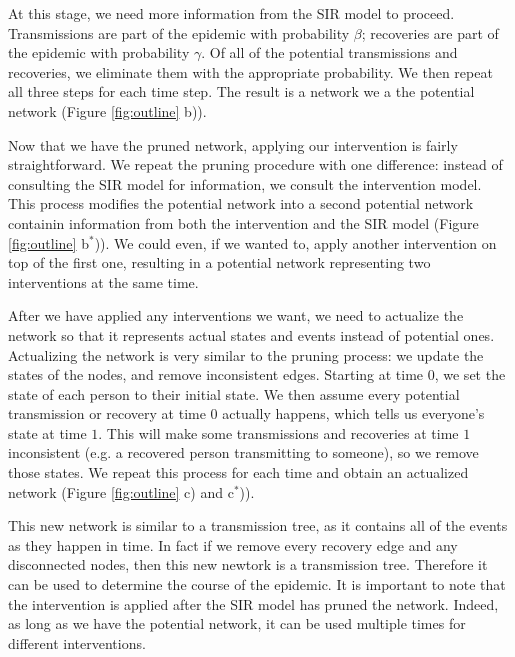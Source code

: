 \documentclass[PTRSB]{rsos}
\begin{document}
\begin{multicols}{2}
At this stage, we need more information from the SIR model to proceed.
Transmissions are part of the epidemic with probability $\beta$; recoveries are part of the epidemic with probability $\gamma$.
Of all of the potential transmissions and recoveries, we eliminate them with the appropriate probability.
We then repeat all three steps for each time step.
The result is a network we a the potential network (Figure \ref{fig:outline} b)).

Now that we have the pruned network, applying our intervention is fairly straightforward.
We repeat the pruning procedure with one difference: instead of consulting the SIR model for information, we consult the intervention model.
This process modifies the potential network into a second potential network containin information from both the intervention and the SIR model (Figure \ref{fig:outline} b${}^*$)).
We could even, if we wanted to, apply another intervention on top of the first one, resulting in a potential network representing two interventions at the same time.

After we have applied any interventions we want, we need to actualize the network so that it represents actual states and events instead of potential ones.
Actualizing the network is very similar to the pruning process: we update the states of the nodes, and remove inconsistent edges.
Starting at time $0$, we set the state of each person to their initial state.
We then assume every potential transmission or recovery at time $0$ actually happens, which tells us everyone's state at time $1$.
This will make some transmissions and recoveries at time $1$ inconsistent (e.g. a recovered person transmitting to someone), so we remove those states.
We repeat this process for each time and obtain an actualized network (Figure \ref{fig:outline} c) and c${}^*$)).

This new network is similar to a transmission tree, as it contains all of the events as they happen in time.
In fact if we remove every recovery edge and any disconnected nodes, then this new newtork is a transmission tree.
Therefore it can be used to determine the course of the epidemic.
It is important to note that the intervention is applied after the SIR model has pruned the network.
Indeed, as long as we have the potential network, it can be used multiple times for different interventions.


\end{multicols}
\end{document}
